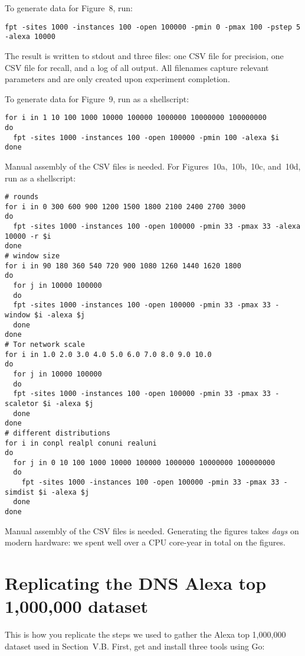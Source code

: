 \documentclass{article}
\begin{document}
To generate data for Figure~8, run:

\begin{lstlisting}
fpt -sites 1000 -instances 100 -open 100000 -pmin 0 -pmax 100 -pstep 5 -alexa 10000
\end{lstlisting}

The result is written to stdout and three files: one CSV file for precision,
one CSV file for recall, and a log of all output. All filenames capture relevant
parameters and are only created upon experiment completion.

To generate data for Figure~9, run as a shellscript:

\begin{lstlisting}
for i in 1 10 100 1000 10000 100000 1000000 10000000 100000000
do
  fpt -sites 1000 -instances 100 -open 100000 -pmin 100 -alexa $i
done
\end{lstlisting}

Manual assembly of the CSV files is needed. For Figures~10a,~10b,~10c, and~10d,
run as a shellscript:

\begin{lstlisting}
# rounds
for i in 0 300 600 900 1200 1500 1800 2100 2400 2700 3000
do
  fpt -sites 1000 -instances 100 -open 100000 -pmin 33 -pmax 33 -alexa 10000 -r $i
done
# window size
for i in 90 180 360 540 720 900 1080 1260 1440 1620 1800
do
  for j in 10000 100000
  do
  fpt -sites 1000 -instances 100 -open 100000 -pmin 33 -pmax 33 -window $i -alexa $j
  done
done
# Tor network scale
for i in 1.0 2.0 3.0 4.0 5.0 6.0 7.0 8.0 9.0 10.0
do
  for j in 10000 100000
  do
  fpt -sites 1000 -instances 100 -open 100000 -pmin 33 -pmax 33 -scaletor $i -alexa $j
  done
done
# different distributions
for i in conpl realpl conuni realuni
do
  for j in 0 10 100 1000 10000 100000 1000000 10000000 100000000
  do
    fpt -sites 1000 -instances 100 -open 100000 -pmin 33 -pmax 33 -simdist $i -alexa $j
  done
done
\end{lstlisting}

Manual assembly of the CSV files is needed.
Generating the figures takes \emph{days} on modern
hardware: we spent well over a CPU core-year in total on the figures.

\section{Replicating the DNS Alexa top 1,000,000 data\-set}
This is how you replicate the steps we used to gather the Alexa top 1,000,000
dataset used in Section~V.B.  First, get and install three tools using Go:
\end{document}
